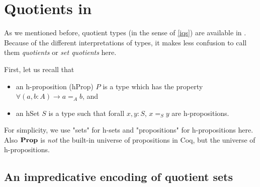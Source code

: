 













\section{Quotients in \hott}\label{qthott}

As we mentioned before, quotient types (in the sense of \ref{iqs}) are available in \hott. Because of the different interpretations of types, it makes less confusion to call them \emph{quotients} or \emph{set quotients} here.

First, let us recall that

\begin{itemize}
\item an h-proposition (hProp) $P$ is a type which has the property $\forall(a, b : A) \to a =_{A} b$, and

\item an hSet $S$ is a type such that forall $x, y : S$, $x =_{S} y$ are h-propositions.
\end{itemize}

For simplicity, we use "sets" for h-sets and "propositions" for h-propositions here. Also $\operatorname{\mathbf{Prop}}$ is \emph{not} the built-in universe of propositions in Coq, but the universe of h-propositions.

\subsection{An impredicative encoding of quotient sets}\label{impredicative}


